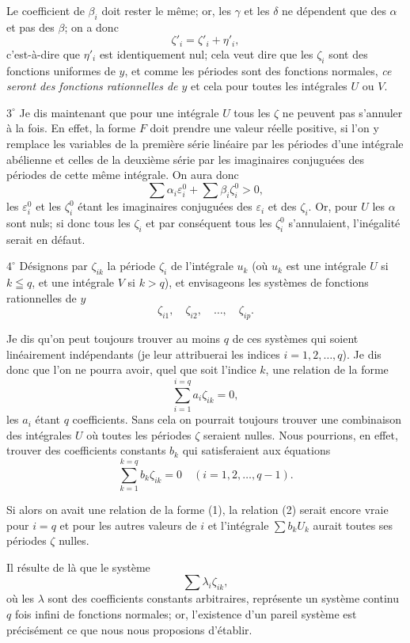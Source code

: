 \documentclass{article}
\begin{document}
Le coefficient de $\beta_{i}$ doit rester le même; or, les $\gamma$ et les $\delta$ ne dépendent que des $\alpha$ et pas des $\beta$; on a donc
\[
\zeta'_{i} = \zeta'_{i} + \eta'_{i},
\]
c'est-à-dire que $\eta'_{i}$ est identiquement nul; cela veut dire que les $\zeta_{i}$ sont des fonctions uniformes de $y$, et comme les périodes sont des fonctions normales, \emph{ce seront des fonctions rationnelles de $y$} et cela pour toutes les intégrales $U$ ou $V$.

$3^\circ$ Je dis maintenant que pour une intégrale $U$ tous les $\zeta$ ne peuvent pas s'annuler à la fois. En effet, la forme $F$ doit prendre une valeur réelle positive, si l'on y remplace les variables de la première série linéaire par les périodes d'une intégrale abélienne et celles de la deuxième série par les imaginaires conjuguées des périodes de cette même intégrale. On aura donc
\[
\sum \alpha_{i} \varepsilon_{i}^{0} + \sum \beta_{i} \zeta_{i}^{0} > 0,
\]
les $\varepsilon_{i}^{0}$ et les $\zeta_{i}^{0}$ étant les imaginaires conjuguées des $\varepsilon_{i}$ et des $\zeta_{i}$. Or, pour $U$ les $\alpha$ sont nuls; si donc tous les $\zeta_{i}$ et par conséquent tous les $\zeta_{i}^{0}$ s'annulaient, l'inégalité serait en défaut.

$4^\circ$ Désignons par $\zeta_{ik}$ la période $\zeta_{i}$ de l'intégrale $u_{k}$ (où $u_{k}$ est une intégrale $U$ si $k \leqq q$, et une intégrale $V$ si $k > q$), et envisageons les systèmes de fonctions rationnelles de $y$
\[
\zeta_{i1}, \quad \zeta_{i2}, \quad \ldots, \quad \zeta_{ip}.
\]

Je dis qu'on peut toujours trouver au moins $q$ de ces systèmes qui soient linéairement indépendants (je leur attribuerai les indices $i = 1, 2, \ldots, q$). Je dis donc que l'on ne pourra avoir, quel que soit l'indice $k$, une relation de la forme
\[
\sum_{i=1}^{i=q} a_{i} \zeta_{ik} = 0, \tag{1}
\]
les $a_{i}$ étant $q$ coefficients. Sans cela on pourrait toujours trouver une combinaison des intégrales $U$ où toutes les périodes $\zeta$ seraient nulles. Nous pourrions, en effet, trouver des coefficients constants $b_{k}$ qui satisferaient aux équations
\[
\sum_{k=1}^{k=q} b_{k} \zeta_{ik} = 0 \quad (i = 1, 2, \ldots, q - 1). \tag{2}
\]

Si alors on avait une relation de la forme (1), la relation (2) serait encore vraie pour $i = q$ et pour les autres valeurs de $i$ et l'intégrale $\displaystyle\sum b_{k} U_{k}$ aurait toutes ses périodes $\zeta$ nulles.

Il résulte de là que le système
\[
\sum \lambda_{i} \zeta_{ik},
\]
où les $\lambda$ sont des coefficients constants arbitraires, représente un système continu $q$ fois infini de fonctions normales; or, l'existence d'un pareil système est précisément ce que nous nous proposions d'établir.
\end{document}
